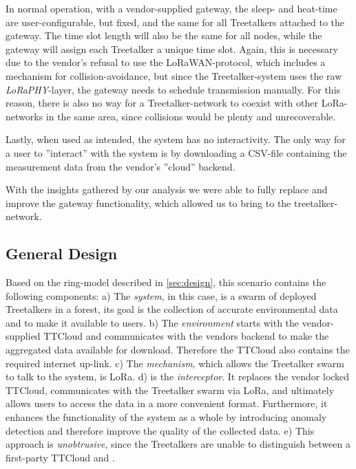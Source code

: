 In normal operation, with a vendor-supplied gateway, the sleep- and heat-time are user-configurable, but fixed, and the same for all Treetalkers attached to the gateway.
The time slot length will also be the same for all nodes, while the gateway will assign each Treetalker a unique time slot.
Again, this is necessary due to the vendor's refusal to use the LoRaWAN-protocol, which includes a mechanism for collision-avoidance, but since the Treetalker-system uses the raw \textit{LoRaPHY}-layer, the gateway needs to schedule transmission manually.
For this reason, there is also no way for a Treetalker-network to coexist with other LoRa-networks in the same area, since collisions would be plenty and unrecoverable.

Lastly, when used as intended, the system has no interactivity.
The only way for a user to ''interact'' with the system is by downloading a CSV-file containing the measurement data from the vendor's ''cloud'' backend.

With the insights gathered by our analysis we were able to fully replace and improve the gateway functionality, which allowed us to bring \mm to the treetalker-network.

\subsection{General Design}
\label{sec:treetalker:design}

Based on the ring-model described in \ref{sec:design}, this scenario contains the following components:
a) The \textit{system}, in this case, is a swarm of deployed Treetalkers in a forest, its goal is the collection of accurate environmental data and to make it available to users.
b) The \textit{environment} starts with the vendor-supplied TTCloud and communicates with the vendors backend to make the aggregated data available for download.
Therefore the TTCloud also contains the required internet up-link.
c) The \textit{mechanism}, which allows the Treetalker swarm to talk to the system, is LoRa.
d) \textit{\ttt} is the \textit{interceptor}.
It replaces the vendor locked TTCloud, communicates with the Treetalker swarm via LoRa, and ultimately allows users to access the data in a more convenient format.
Furthermore, it enhances the functionality of the system as a whole by introducing anomaly detection and therefore improve the quality of the collected data.
e) This approach is \textit{unobtrusive}, since the Treetalkers are unable to distinguish between a first-party TTCloud and \ttt.

